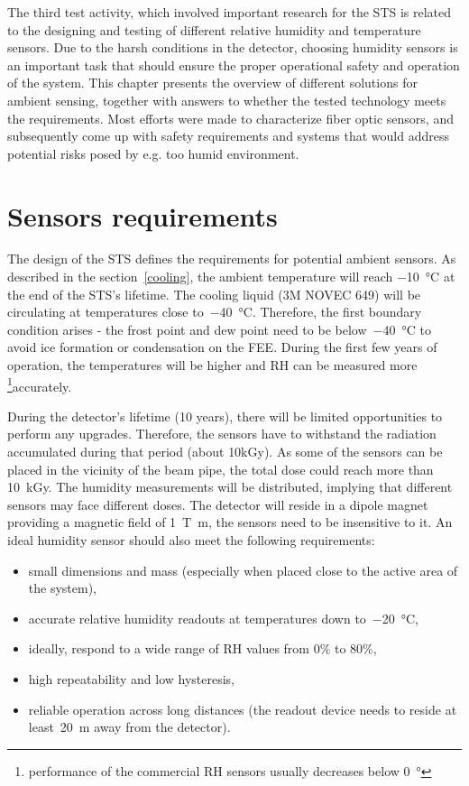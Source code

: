 The third test activity, which involved important research for the \gls{STS} is related to the designing and testing of different relative humidity and temperature sensors. Due to the harsh conditions in the detector, choosing humidity sensors is an important task that should ensure the proper operational safety and operation of the system. This chapter presents the overview of different solutions for ambient sensing, together with answers to whether the tested technology meets the requirements. Most efforts were made to characterize fiber optic sensors, and subsequently come up with safety requirements and systems that would address potential risks posed by e.g. too humid environment. 

\section{Sensors requirements}

The design of the \gls{STS} \cite{Heuser:54798} defines the requirements for potential ambient sensors. As described in the section~\ref{cooling}, the ambient temperature will reach \SI{-10}{\celsius} at the end of the \gls{STS}'s lifetime. The cooling liquid (3M NOVEC 649) will be circulating at temperatures close to~\SI{-40}{\celsius}. Therefore, the first boundary condition arises - the frost point and dew point need to be below~\SI{-40}{\celsius} to avoid ice formation or condensation on the \gls{FEE}.
During the first few years of operation, the temperatures will be higher and  RH can be measured more \footnote{performance of the commercial RH sensors usually decreases below \SI{0}{\degree}}{accurately}. 

During the detector's lifetime (10 years), there will be limited opportunities to perform any upgrades. Therefore, the sensors have to withstand the radiation accumulated during that period (about 10kGy). As some of the sensors can be placed in the vicinity of the beam pipe, the total dose could reach more than 10~kGy. The humidity measurements will be distributed, implying that different sensors may face different doses. 
The detector will reside in a dipole magnet providing a magnetic field of \SI{1}{\tesla\metre}, the sensors need to be insensitive to it. An ideal humidity sensor should also meet the following requirements:
\begin{itemize}
    \item small dimensions and mass (especially when placed close to the active area of the system),
    \item accurate relative humidity readouts at temperatures down to~\SI{-20}{\celsius}, 
    \item ideally, respond to a wide range of \gls{RH} values from 0\% to 80\%,
    \item high repeatability and low hysteresis,
    \item reliable operation across long distances (the readout device needs to reside at least~\SI{20}{\metre} away from the detector).
\end{itemize}

